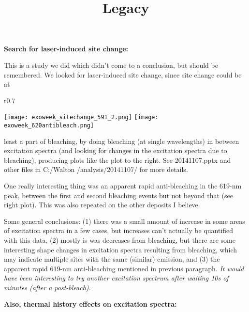 \documentclass{article}
\title{Legacy} %
\author{}
\date{}
\begin{document}
\maketitle

\setlength{\intextsep}{0pt}%

\noindent
\textbf{Search for laser-induced site change:}

This is a study we did which didn't come to a conclusion, but should be remembered.  We looked for laser-induced site change, since site change could be at
\begin{wrapfigure}{r}{0.7\textwidth}
  \begin{center}
    \texttt{[image: exoweek\_sitechange\_591\_2.png]}
    \texttt{[image: exoweek\_620antibleach.png]}
  \end{center}
\end{wrapfigure}
least a part of bleaching, by doing bleaching (at single wavelengths) in between excitation spectra (and looking for changes in the excitation spectra due to bleaching), producing plots like the plot to the right.  See 20141107.pptx and other files in C:/Walton \newline /analysis/20141107/ for more details.

\vspace{3mm}

\noindent
One really interesting thing was an apparent rapid anti-bleaching in the 619-nm peak, between the first and second bleaching events but not beyond that (see right plot).  This was also repeated on the other deposits I believe.

\vspace{3mm}

\noindent
Some general conclusions:  (1) there was a small amount of increase in some areas of excitation spectra in a few cases, but increases can't actually be quantified with this data, (2) mostly is was decreases from bleaching, but there are some interesting shape changes in excitation spectra resulting from bleaching, which may indicate multiple sites with the same (similar) emission, and (3) the apparent rapid 619-nm anti-bleaching mentioned in previous paragraph.  \emph{It would have been interesting to try another excitation spectrum after waiting 10s of minutes (after a post-bleach).}

\newpage

\noindent
\textbf{Also, thermal history effects on excitation spectra:}
\end{document}

